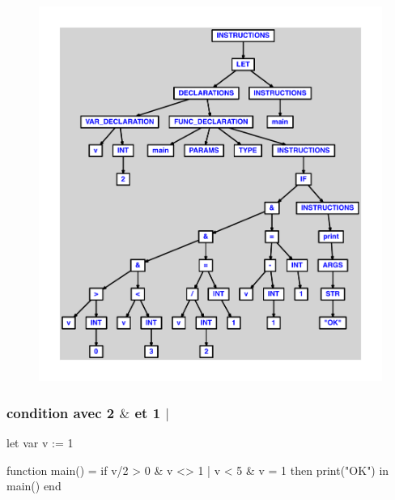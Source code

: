 \documentclass{article}
\begin{document}
\begin{figure}[H]\centering\includegraphics[max width=\textwidth]{ast/ast_3.pdf}\end{figure}\subsubsection{condition avec 2 $ \& $ et 1 $ | $}
\begin{verbatimtab}
let
	var v := 1

	function main() =
		if v/2 > 0 & v <> 1 | v < 5 & v = 1 then print("OK")
in main() end
\end{verbatimtab}
\end{document}
